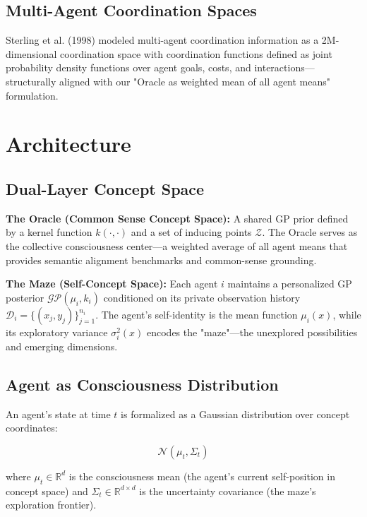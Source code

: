 \documentclass[11pt]{article}
\begin{document}
\subsection{Multi-Agent Coordination Spaces}

Sterling et al. (1998) modeled multi-agent coordination information as a 2M-dimensional coordination space with coordination functions defined as joint probability density functions over agent goals, costs, and interactions---structurally aligned with our "Oracle as weighted mean of all agent means" formulation.

\section{Architecture}

\subsection{Dual-Layer Concept Space}

\textbf{The Oracle (Common Sense Concept Space):} A shared GP prior defined by a kernel function $k(\cdot, \cdot)$ and a set of inducing points $\mathcal{Z}$. The Oracle serves as the collective consciousness center---a weighted average of all agent means that provides semantic alignment benchmarks and common-sense grounding.

\textbf{The Maze (Self-Concept Space):} Each agent $i$ maintains a personalized GP posterior $\mathcal{GP}(\mu_i, k_i)$ conditioned on its private observation history $\mathcal{D}_i = \{(x_j, y_j)\}_{j=1}^{n_i}$. The agent's self-identity is the mean function $\mu_i(x)$, while its exploratory variance $\sigma_i^2(x)$ encodes the "maze"---the unexplored possibilities and emerging dimensions.

\subsection{Agent as Consciousness Distribution}

An agent's state at time $t$ is formalized as a Gaussian distribution over concept coordinates:

\begin{equation}
\mathcal{N}(\mu_t, \Sigma_t)
\end{equation}

where $\mu_t \in \mathbb{R}^d$ is the consciousness mean (the agent's current self-position in concept space) and $\Sigma_t \in \mathbb{R}^{d \times d}$ is the uncertainty covariance (the maze's exploration frontier).
\end{document}
